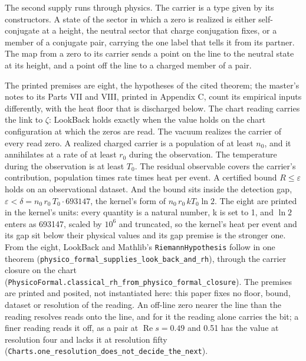 \documentclass[10pt]{article}
\begin{document}
The second supply runs through physics. The carrier is a type given by
its constructors. A state of the sector in which a zero is realized is
either self-conjugate at a height, the neutral sector that charge
conjugation fixes, or a member of a conjugate pair, carrying the one
label that tells it from its partner. The map from a zero to its carrier
sends a point on the line to the neutral state at its height, and a
point off the line to a charged member of a pair.

The printed premises are eight, the hypotheses of the cited theorem; the
master's notes to its Parts VII and VIII, printed in Appendix C, count
its empirical inputs differently, with the heat floor that is discharged
below. The chart reading carries the link to \(\zeta\): LookBack holds
exactly when the value holds on the chart configuration at which the
zeros are read. The vacuum realizes the carrier of every read zero. A
realized charged carrier is a population of at least \(n_0\), and it
annihilates at a rate of at least \(r_0\) during the observation. The
temperature during the observation is at least \(T_0\). The residual
observable covers the carrier's contribution, population times rate
times heat per event. A certified bound \(R \le \varepsilon\) holds on
an observational dataset. And the bound sits inside the detection gap,
\(\varepsilon < \delta = n_0\, r_0\, T_0 \cdot 693147\), the kernel's
form of \(n_0\, r_0\, kT_0 \ln 2\). The eight are printed in the
kernel's units: every quantity is a natural number, k is set to 1, and
\(\ln 2\) enters as 693147, scaled by \(10^{6}\) and truncated, so the
kernel's heat per event and its gap sit below their physical values and
its gap premise is the stronger one. From the eight, LookBack and
Mathlib's \texttt{RiemannHypothesis} follow in one theorem
(\texttt{physico\_\allowbreak{}formal\_\allowbreak{}supplies\_\allowbreak{}look\_\allowbreak{}back\_\allowbreak{}and\_\allowbreak{}rh}),
through the carrier closure on the chart
(\texttt{PhysicoFormal.\allowbreak{}classical\_\allowbreak{}rh\_\allowbreak{}from\_\allowbreak{}physico\_\allowbreak{}formal\_\allowbreak{}closure}).
The premises are printed and posited, not instantiated here: this paper
fixes no floor, bound, dataset or resolution of the reading. An off-line
zero nearer the line than the reading resolves reads onto the line, and
for it the reading alone carries the bit; a finer reading reads it off,
as a pair at \(\operatorname{Re} s = 0.49\) and 0.51 has the value at
resolution four and lacks it at resolution fifty
(\texttt{Charts.\allowbreak{}one\_\allowbreak{}resolution\_\allowbreak{}does\_\allowbreak{}not\_\allowbreak{}decide\_\allowbreak{}the\_\allowbreak{}next}).
\end{document}
